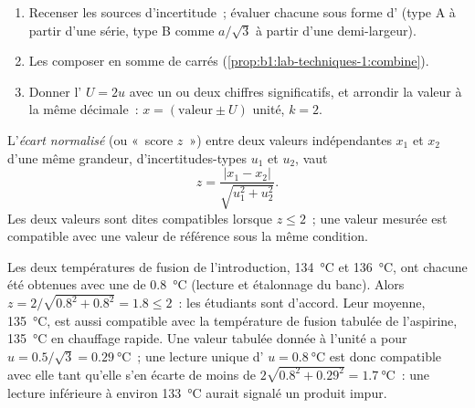 \begin{method}\label{met:b1:lab-techniques-1:report-result}
\begin{enumerate}
  \item Recenser les sources d'incertitude~; évaluer chacune sous forme
        d' (type A à partir d'une série, type B comme
        $a/\sqrt3$ à partir d'une demi-largeur).
  \item Les composer en somme de carrés (\cref{prop:b1:lab-techniques-1:combine}).
  \item Donner l' $U = 2u$ avec un ou deux chiffres
        significatifs, et arrondir la valeur à la même décimale~:
        $x = (\text{valeur} \pm U)$ unité, $k = 2$.
\end{enumerate}
\end{method}

\begin{definition}\label{def:b1:lab-techniques-1:z-score}
L'\emph{écart normalisé} (ou
«~score $z$~») entre deux valeurs indépendantes $x_1$ et $x_2$
d'une même grandeur, d'incertitudes-types $u_1$ et $u_2$, vaut
\[
  z = \frac{|x_1 - x_2|}{\sqrt{u_1^2 + u_2^2}} .
\]
Les deux valeurs sont dites compatibles lorsque $z \le 2$~; une valeur
mesurée est compatible avec une valeur de référence sous la même
condition.
\end{definition}

\begin{example}
Les deux températures de fusion de l'introduction, \qty{134}{\celsius}
et \qty{136}{\celsius}, ont chacune été obtenues avec une 
de \qty{0.8}{\celsius} (lecture et étalonnage du banc). Alors
$z = 2/\sqrt{0.8^2 + 0.8^2} = 1.8 \le 2$~: les étudiants sont d'accord.
Leur moyenne, \qty{135}{\celsius}, est aussi compatible avec la
température de fusion tabulée de l'aspirine, \qty{135}{\celsius} en
chauffage rapide. Une valeur tabulée donnée à l'unité a pour
 $u = 0.5/\sqrt3 = \qty{0.29}{\celsius}$~; une lecture
unique d' $u = \qty{0.8}{\celsius}$ est donc compatible
avec elle tant qu'elle s'en écarte de moins de
$2\sqrt{0.8^2 + 0.29^2} = \qty{1.7}{\celsius}$~: une lecture inférieure à
environ \qty{133}{\celsius} aurait signalé un produit impur.
\end{example}

